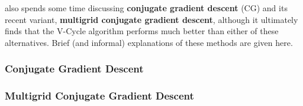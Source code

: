 \cite{lee14} also spends some time discussing \textbf{conjugate gradient descent} (CG) and its recent variant, \textbf{multigrid conjugate gradient descent}, although it ultimately finds that the V-Cycle algorithm performs much better than either of these alternatives. Brief (and informal) explanations of these methods are given here.
\subsubsection{Conjugate Gradient Descent}

\subsubsection{Multigrid Conjugate Gradient Descent}
